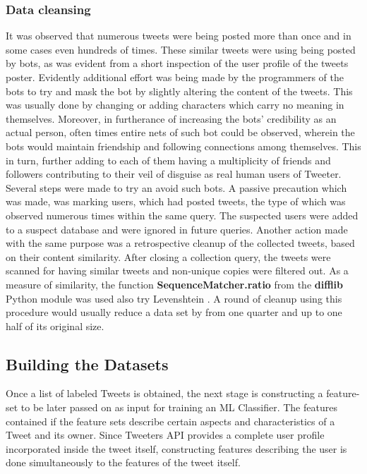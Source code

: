 		\subsubsection*{Data cleansing}
		It was observed that numerous tweets were being posted more than once and in some cases even hundreds of times. These similar tweets were using being posted by bots, as was evident from a short inspection of the user profile of the tweets poster. Evidently additional effort was being made by the programmers of the bots to try and mask the bot by slightly altering the content of the tweets. This was usually done by changing or adding characters which carry no meaning in themselves. Moreover, in furtherance of increasing the bots' credibility as an actual person, often times entire nets of such bot could be observed, wherein the bots would maintain friendship and following connections among themselves. This in turn, further adding to each of them having a multiplicity of friends and followers contributing to their veil of disguise as real human users of Tweeter.
		Several steps were made to try an avoid such bots. A passive precaution which was made, was marking users, which had posted tweets, the type of which was observed numerous times within the same query. The suspected users were added to a suspect database and were ignored in future queries. Another action made with the same purpose was a retrospective cleanup of the collected tweets, based on their content similarity. After closing a collection query, the tweets were scanned for having similar tweets and non-unique copies were filtered out. As a measure of similarity, the function \textbf{SequenceMatcher.ratio} from the \textbf{difflib} Python module was used {\color{red} \Large also try Levenshtein }. A round of cleanup using this procedure would usually reduce a data set by from one quarter and up to one half of its original size.
		
		\newpage
		
	\subsection{Building the Datasets}
	Once a list of labeled Tweets is obtained, the next stage is constructing a feature-set to be later passed on as input for training an ML Classifier. The features contained if the feature sets describe certain aspects and characteristics of a Tweet and its owner. Since Tweeters API provides a complete user profile incorporated inside the tweet itself, constructing features describing the user is done simultaneously to the features of the tweet itself.
		
